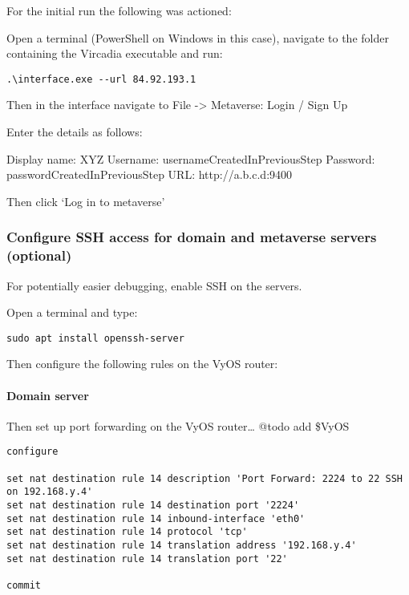 For the initial run the following was actioned:

Open a terminal (PowerShell on Windows in this case), navigate to the
folder containing the Vircadia executable and run:

\begin{verbatim}
.\interface.exe --url 84.92.193.1
\end{verbatim}

Then in the interface navigate to File -\textgreater{} Metaverse: Login
/ Sign Up

Enter the details as follows:

Display name: XYZ Username: usernameCreatedInPreviousStep Password:
passwordCreatedInPreviousStep URL: http://a.b.c.d:9400

Then click `Log in to metaverse'

\hypertarget{configure-ssh-access-for-domain-and-metaverse-servers-optional}{%
\subsubsection{Configure SSH access for domain and metaverse servers
(optional)}\label{configure-ssh-access-for-domain-and-metaverse-servers-optional}}

For potentially easier debugging, enable SSH on the servers.

Open a terminal and type:

\texttt{sudo\ apt\ install\ openssh-server}

Then configure the following rules on the VyOS router:

\hypertarget{domain-server}{%
\paragraph{Domain server}\label{domain-server}}

Then set up port forwarding on the VyOS router\ldots{} @todo add \$VyOS

\begin{verbatim}
configure

set nat destination rule 14 description 'Port Forward: 2224 to 22 SSH on 192.168.y.4'
set nat destination rule 14 destination port '2224'
set nat destination rule 14 inbound-interface 'eth0'
set nat destination rule 14 protocol 'tcp'
set nat destination rule 14 translation address '192.168.y.4'
set nat destination rule 14 translation port '22'

commit
\end{verbatim}

